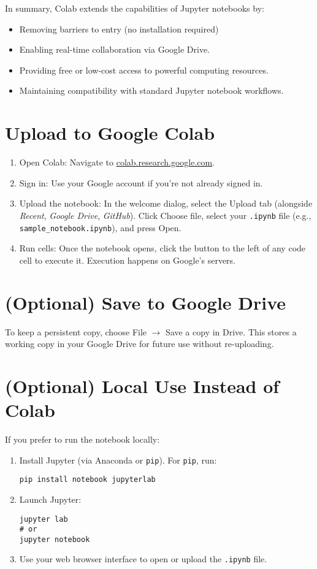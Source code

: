 \documentclass[11pt]{article}
\begin{document}
In summary, Colab extends the capabilities of Jupyter notebooks by:
\begin{itemize}
\item Removing barriers to entry (no installation required)
\item Enabling real-time collaboration via Google Drive.
    \item Providing free or low-cost access to powerful computing resources.
    \item Maintaining compatibility with standard Jupyter notebook workflows.
\end{itemize}

\section{Upload to Google Colab}
\begin{enumerate}[label=Step \arabic*:, leftmargin=*, itemsep=0.6em]
  \item Open Colab: Navigate to
    \href{https://colab.research.google.com}{colab.research.google.com}.    
  \item Sign in: Use your Google account if you're not already signed
    in.    
  \item Upload the notebook: In the welcome dialog, select the Upload
    tab (alongside \emph{Recent}, \emph{Google Drive},
    \emph{GitHub}). Click Choose file, select your \texttt{.ipynb}
    file (e.g., \texttt{sample\_notebook.ipynb}), and press Open.    
  \item Run cells: Once the notebook opens, click the  
    button to the left of any code cell to execute it. Execution
    happens on Google's servers.    
\end{enumerate}

\section{(Optional) Save to Google Drive}
To keep a persistent copy, choose File $\rightarrow$ Save a copy in
Drive. This stores a working copy in your Google Drive for future use
without re-uploading.

\section{(Optional) Local Use Instead of Colab}
If you prefer to run the notebook locally:
\begin{enumerate}[label=\alph*), leftmargin=*, itemsep=0.4em]
  \item Install Jupyter (via Anaconda or \texttt{pip}). For \texttt{pip}, run:
\begin{lstlisting}[style=cmd]
pip install notebook jupyterlab
\end{lstlisting}
  \item Launch Jupyter:
\begin{lstlisting}[style=cmd]
jupyter lab
# or
jupyter notebook
\end{lstlisting}
  \item Use your web browser interface to open or upload the \texttt{.ipynb} file.
\end{enumerate}
\end{document}
